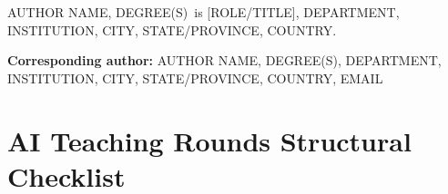 \documentclass[12pt]{article}
\newcommand{\AuthorName}{AUTHOR NAME, DEGREE(S)}
\newcommand{\AuthorAffiliation}{DEPARTMENT, INSTITUTION, CITY, STATE/PROVINCE, COUNTRY}
\newcommand{\CorrespondingEmail}{EMAIL}
\begin{document}

\vspace{1em}

\noindent
\AuthorName\ is [ROLE/TITLE], \AuthorAffiliation.

\vspace{0.5em}

\noindent
\textbf{Corresponding author:}
\AuthorName,
\AuthorAffiliation,
\CorrespondingEmail


\clearpage
\section*{AI Teaching Rounds Structural Checklist}
\end{document}
